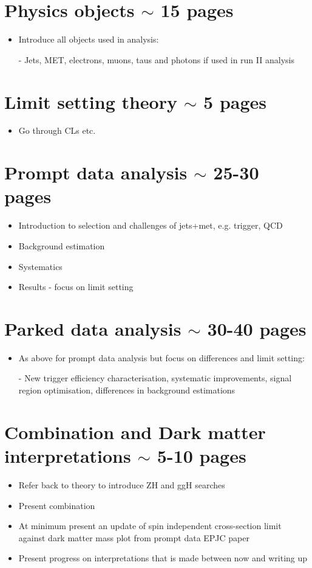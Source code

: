 \documentclass[12pt]{article}
\begin{document}
\section{Physics objects $\sim$ 15 pages}
\begin{itemize}
\label{sec:physobjects}
\item Introduce all objects used in analysis:
\item[-] Jets, MET, electrons, muons, taus and photons if used in run II analysis
\end{itemize}

\section{Limit setting theory $\sim$ 5 pages}
\begin{itemize}
\label{sec:limits}
\item Go through CLs etc.
\end{itemize}

\section{Prompt data analysis $\sim$ 25-30 pages}
\begin{itemize}
\label{sec:promptana}
\item Introduction to selection and challenges of jets+met, e.g. trigger, QCD
\item Background estimation
\item Systematics
\item Results - focus on limit setting
\end{itemize}

\section{Parked data analysis $\sim$ 30-40 pages}
\begin{itemize}
\label{sec:parkedana}
\item As above for prompt data analysis but focus on differences and limit setting:
\item[-] New trigger efficiency characterisation, systematic improvements, signal region optimisation, differences in background estimations
\end{itemize}

\section{Combination and Dark matter interpretations $\sim$ 5-10 pages}
\begin{itemize}
\label{sec:interpretations}
\item Refer back to theory to introduce ZH and ggH searches
\item Present combination
\item At minimum present an update of spin independent cross-section limit against dark matter mass plot from prompt data EPJC paper
\item Present progress on interpretations that is made between now and writing up
\end{itemize}
\end{document}
